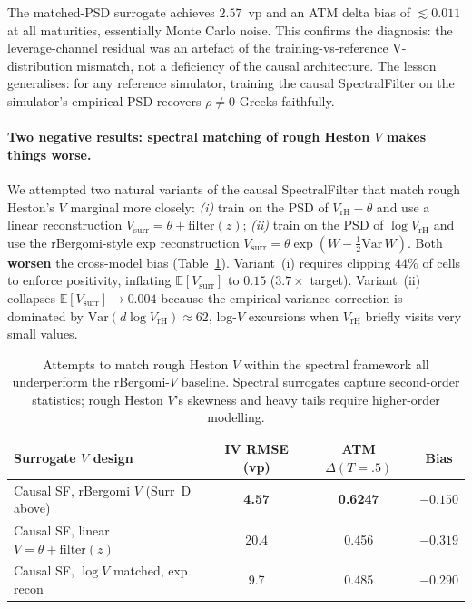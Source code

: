 \documentclass[11pt,a4paper]{article}
\newcommand{\E}{\mathbb{E}}
\begin{document}
The matched-PSD surrogate achieves $2.57$~vp and an ATM delta bias of
$\lesssim 0.011$ at all maturities, essentially Monte Carlo noise.
This confirms the diagnosis: the leverage-channel residual was an
artefact of the training-vs-reference V-distribution mismatch, not a
deficiency of the causal architecture. The lesson generalises: for
any reference simulator, training the causal SpectralFilter on the
simulator's empirical PSD recovers $\rho \neq 0$ Greeks faithfully.

\paragraph{Two negative results: spectral matching of rough Heston $V$
makes things worse.}
We attempted two natural variants of the causal SpectralFilter that
match rough Heston's $V$ marginal more closely:
\emph{(i)} train on the PSD of $V_{\mathrm{rH}}-\theta$ and use a linear
reconstruction $V_{\mathrm{surr}} = \theta + \mathrm{filter}(z)$;
\emph{(ii)} train on the PSD of $\log V_{\mathrm{rH}}$ and use the
rBergomi-style exp reconstruction
$V_{\mathrm{surr}} = \theta \exp(W - \tfrac{1}{2}\mathrm{Var}\,W)$.
Both \textbf{worsen} the cross-model bias (Table~\ref{tab:rh-negatives}).
Variant~(i) requires clipping $44\%$ of cells to enforce positivity,
inflating $\E[V_{\mathrm{surr}}]$ to $0.15$ ($3.7\times$ target).
Variant~(ii) collapses $\E[V_{\mathrm{surr}}]\to 0.004$ because the
empirical variance correction is dominated by
$\mathrm{Var}(d\log V_{\mathrm{rH}}) \approx 62$, log-$V$ excursions
when $V_{\mathrm{rH}}$ briefly visits very small values.

\begin{table}[h]
\centering
\caption{Attempts to match rough Heston $V$ within the spectral framework
all underperform the rBergomi-$V$ baseline. Spectral surrogates capture
second-order statistics; rough Heston $V$'s skewness and heavy tails
require higher-order modelling.}
\label{tab:rh-negatives}
\begin{tabular}{lccc}
\toprule
Surrogate $V$ design & IV RMSE (vp) & ATM $\Delta(T=.5)$ & Bias \\
\midrule
Causal SF, rBergomi $V$ (Surr~D above)       & \textbf{4.57} & \textbf{0.6247} & \textbf{$-0.150$} \\
Causal SF, linear $V = \theta + \mathrm{filter}(z)$ & 20.4 & 0.456 & $-0.319$ \\
Causal SF, $\log V$ matched, exp recon       & 9.7 & 0.485 & $-0.290$ \\
\bottomrule
\end{tabular}
\end{table}
\end{document}
